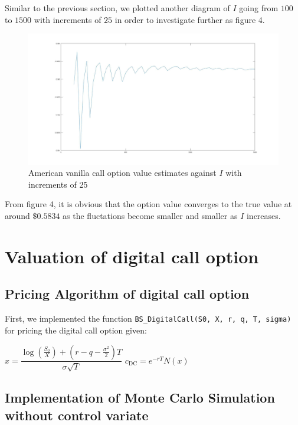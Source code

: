 Similar to the previous section, we plotted another diagram of $I$ going from $100$ to $1500$ with increments of $25$ in order to investigate further as figure 4.

\begin{figure}[htbp!]
	\centering
	\includegraphics[scale=0.2]{largePlot2.jpg}
	\caption{American vanilla call option value estimates against $I$ with increments of 25}
\end{figure}

From figure 4, it is obvious that the option value converges to the true value at around $\$0.5834$ as the fluctations become smaller and smaller as $I$ increases.

\section{Valuation of digital call option}

\subsection{Pricing Algorithm of digital call option}

First, we implemented the function \texttt{BS\_DigitalCall(S0, X, r, q,  T, sigma)} for pricing the digital call option given:

\begin{algorithm}[H]
	$x = \dfrac{\log \left(\frac{S_0}{X}\right) + (r - q - \frac{\sigma^2}{2})T}{\sigma \sqrt{T}}$\;
	$c_{\text{DC}} = e^{-rT} N(x)$\;
\end{algorithm}

\subsection{Implementation of Monte Carlo Simulation without control variate}

